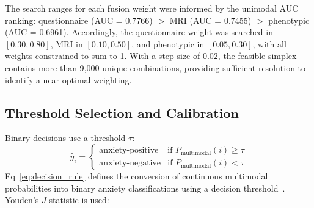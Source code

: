 \documentclass[10pt,letterpaper]{article}
\newcommand{\hlpar}[1]{\leavevmode\colorbox{yellow!30}{\parbox{\dimexpr\linewidth-2\fboxsep\relax}{#1}}\vspace{2pt}}
\begin{document}
                                                                                                                   \hlpar{The search ranges for each fusion weight were informed by the unimodal AUC ranking: questionnaire (AUC = 0.7766) $>$ MRI (AUC = 0.7455) $>$ phenotypic (AUC = 0.6961). Accordingly, the questionnaire weight was searched in $[0.30, 0.80]$, MRI in $[0.10, 0.50]$, and phenotypic in $[0.05, 0.30]$, with all weights constrained to sum to 1. With a step size of 0.02, the feasible simplex contains more than 9{,}000 unique combinations, providing sufficient resolution to identify a near-optimal weighting.}

                                                                                                                  \subsection*{Threshold Selection and Calibration}
                                                                                                                  Binary decisions use a threshold $\tau$:
                                                                                                                  \begin{equation}
                                                                                                                  \label{eq:decision_rule}
                                                                                                                  \hat{y}_i =
                                                                                                                  \begin{cases}
                                                                                                                  \text{anxiety-positive} & \text{if } P_{\text{multimodal}}(i)\ge \tau\\
                                                                                                                  \text{anxiety-negative} & \text{if } P_{\text{multimodal}}(i)< \tau
                                                                                                                  \end{cases}
                                                                                                                  \end{equation}
                                                                                                                  Eq~\ref{eq:decision_rule} defines the conversion of continuous multimodal probabilities into binary anxiety classifications using a decision threshold~\cite{ref60}.
                                                                                                                  Youden's $J$ statistic is used:
\end{document}
